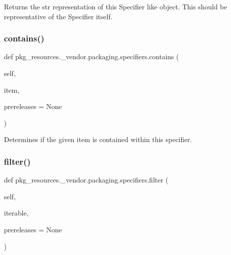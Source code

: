 \begin{DoxyVerb}Returns the str representation of this Specifier like object. This
should be representative of the Specifier itself.
\end{DoxyVerb}
 \mbox{\label{namespacepkg__resources_1_1__vendor_1_1packaging_1_1specifiers_aa8bd89443ae8b900788427e80696e2b8}} 
\subsubsection{\texorpdfstring{contains()}{contains()}}
{\footnotesize\ttfamily def pkg\+\_\+resources.\+\_\+vendor.\+packaging.\+specifiers.\+contains (\begin{DoxyParamCaption}\item[{}]{self,  }\item[{}]{item,  }\item[{}]{prereleases = {\ttfamily None} }\end{DoxyParamCaption})}

\begin{DoxyVerb}Determines if the given item is contained within this specifier.
\end{DoxyVerb}
 \mbox{\label{namespacepkg__resources_1_1__vendor_1_1packaging_1_1specifiers_aa03fee032e431f55d4a2ce76d791d244}} 
\subsubsection{\texorpdfstring{filter()}{filter()}}
{\footnotesize\ttfamily def pkg\+\_\+resources.\+\_\+vendor.\+packaging.\+specifiers.\+filter (\begin{DoxyParamCaption}\item[{}]{self,  }\item[{}]{iterable,  }\item[{}]{prereleases = {\ttfamily None} }\end{DoxyParamCaption})}

